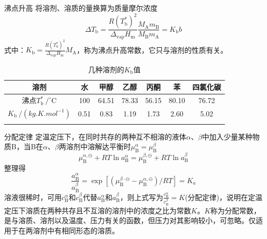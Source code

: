 \begin{frame}{沸点升高}
将溶剂、溶质的量换算为质量摩尔浓度
$$\Delta T_{\mathrm{b}}=\frac{R\left(T_{\mathrm{b}}^{*}\right)^{2}}{\Delta_{\mathrm{vap}} H_{\mathrm{m}}} \frac{M_{\mathrm{A}} m_{\mathrm{B}}}{M_{\mathrm{B}} m_{\mathrm{A}}}=K_{\mathrm{b}} b$$
式中：$K_{\mathrm{b}}=\frac{R\left(T_{\mathrm{b}}^{*}\right)^{2}}{\Delta_{\mathrm{vap}} H_{\mathrm{m}}} M_{\mathrm{A}}$，称为沸点升高常数，它只与溶剂的性质有关。
\begin{table}
    \centering
    \caption{几种溶剂的$K_\mathrm{b}$值}
    \begin{tabular}{ccccccc}
        \Xhline{1pt}
        \rowcolor{maincolor!10}
        溶剂 & 水 & 甲醇 & 乙醇 & 丙酮 & 苯 & 四氯化碳\\
        \hline
        沸点$T_{\mathrm{b}}^{*}~/^{\circ}\mathrm{C}$ & 100 & 64.51 & 78.33 & 56.15 & 80.10 & 76.72\\
        $K_\mathrm{b}~/(\si{kg.K.mol^{-1}})$ & 0.51 & 0.83 & 1.19 & 1.73 & 2.60 & 5.02\\
        \Xhline{1pt}
    \end{tabular}
\end{table}
\end{frame}


\begin{frame}{分配定律}
    定温定压下，在同时共存的两种互不相溶的液体$\alpha$、$\beta$中加入少量某种物质B，当B在$\alpha$、$\beta$两溶剂中溶解达平衡时$\mu_{\mathrm{B}}^{\alpha}=\mu_{\mathrm{B}}^{\beta}$
    $$\mu_{\mathrm{B}}^{\alpha, \ominus}+R T \ln a_{\mathrm{B}}^{\alpha}=\mu_{\mathrm{B}}^{\beta, \ominus}+R T \ln a_{\mathrm{B}}^{\beta}$$
    整理得
    $$\frac{a_{\mathrm{B}}^{\alpha}}{a_{\mathrm{B}}^{\beta}}=\exp [(\mu_{\mathrm{B}}^{\beta \cdot \ominus}-\mu_{\mathrm{B}}^{\alpha, \ominus}) / R T]=K_{a}$$
    溶液很稀时，可用$c_{\mathrm{B}}^{\alpha}$和$c_{\mathrm{B}}^{\beta}$代替$a_{\mathrm{B}}^{\alpha}$和$a_{\mathrm{B}}^{\beta}$，则上式写为$\frac{c_{\mathrm{B}}^{\alpha}}{c_{\mathrm{B}}^{\beta}}=K$(分配定律)，说明在定温定压下溶质在两种共存且不互溶的溶剂中的浓度之比为常数$K$。$K$称为分配常数，是与溶质、溶剂以及温度、压力有关的函数，但压力对其影响较小，可忽略。仅适用于在两溶剂中有相同形态的溶质。    
\end{frame}


